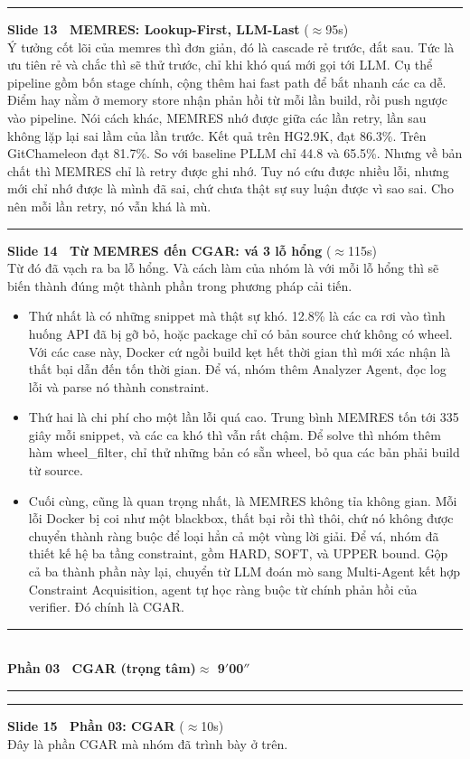 \documentclass[11pt]{article}
\newcommand{\parthead}[2]{%
  \vspace{1.4em}\par
  {\noindent\color{navydeep}\rule{\linewidth}{1.4pt}}\\[0.35em]
  {\bfseries\Large\color{navydeep}#1}\hfill{\normalsize\color{accent}\bfseries #2}\\[-0.35em]
  {\noindent\color{navydeep}\rule{\linewidth}{1.4pt}}
  \par\vspace{0.6em}%
}
\newcommand{\slidehead}[3]{%
  \vspace{1.05em}\par\noindent
  {\color{accent}\rule[-0.18em]{3pt}{1.05em}}\hspace{0.5em}%
  {\bfseries\large\color{navydeep}Slide #1 \textperiodcentered\ #2}%
  \hfill{\small\color{gray}(#3)}\\[0.25em]%
}
\begin{document}
\slidehead{13}{MEMRES: Lookup-First, LLM-Last}{$\approx$95s}
Ý tưởng cốt lõi của memres thì đơn giản, đó là cascade rẻ trước, đắt sau. Tức là ưu tiên rẻ và chắc thì sẽ thử trước, chỉ khi khó quá mới gọi tới LLM. Cụ thể pipeline gồm bốn stage chính, cộng thêm hai fast path để bắt nhanh các ca dễ. Điểm hay nằm ở memory store nhận phản hồi từ mỗi lần build, rồi push ngược vào pipeline. Nói cách khác, MEMRES nhớ được giữa các lần retry, lần sau không lặp lại sai lầm của lần trước. Kết quả trên HG2.9K, đạt 86.3\%. Trên GitChameleon đạt 81.7\%. So với baseline PLLM chỉ 44.8 và 65.5\%. Nhưng về bản chất thì MEMRES chỉ là retry được ghi nhớ. Tuy nó cứu được nhiều lỗi, nhưng mới chỉ nhớ được là mình đã sai, chứ chưa thật sự suy luận được vì sao sai. Cho nên mỗi lần retry, nó vẫn khá là mù.

\slidehead{14}{Từ MEMRES đến CGAR: vá 3 lỗ hổng}{$\approx$115s}
Từ đó đã vạch ra ba lỗ hổng. Và cách làm của nhóm là với mỗi lỗ hổng thì sẽ biến thành đúng một thành phần trong phương pháp cải tiến.
\begin{itemize}
  \item Thứ nhất là có những snippet mà thật sự khó. 12.8\% là các ca rơi vào tình huống API đã bị gỡ bỏ, hoặc package chỉ có bản source chứ không có wheel. Với các case này, Docker cứ ngồi build kẹt hết thời gian thì mới xác nhận là thất bại dẫn đến tốn thời gian. Để vá, nhóm thêm Analyzer Agent, đọc log lỗi và parse nó thành constraint.
  \item Thứ hai là chi phí cho một lần lỗi quá cao. Trung bình MEMRES tốn tới 335 giây mỗi snippet, và các ca khó thì vẫn rất chậm. Để solve thì nhóm thêm hàm wheel\_filter, chỉ thử những bản có sẵn wheel, bỏ qua các bản phải build từ source.
  \item Cuối cùng, cũng là quan trọng nhất, là MEMRES không tỉa không gian. Mỗi lỗi Docker bị coi như một blackbox, thất bại rồi thì thôi, chứ nó không được chuyển thành ràng buộc để loại hẳn cả một vùng lời giải. Để vá, nhóm đã thiết kế hệ ba tầng constraint, gồm HARD, SOFT, và UPPER bound. Gộp cả ba thành phần này lại, chuyển từ LLM đoán mò sang Multi-Agent kết hợp Constraint Acquisition, agent tự học ràng buộc từ chính phản hồi của verifier. Đó chính là CGAR.
\end{itemize}

\parthead{Phần 03 \textperiodcentered\ CGAR (trọng tâm)}{$\approx$ 9$'$00$''$}

\slidehead{15}{Phần 03: CGAR}{$\approx$10s}
Đây là phần CGAR mà nhóm đã trình bày ở trên.
\end{document}
